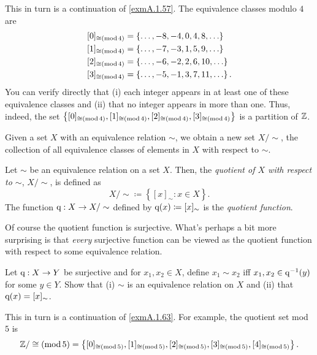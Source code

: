 \begin{exm}\label{exmA.1.63}
This in turn is a continuation of \cref{exmA.1.57}.  The equivalence classes modulo $4$ are
\begin{equation}
\begin{split}
[0]_{\cong \left( \mathrm{mod}\, 4\right)} & =\left\{ \ldots ,-8,-4,0,4,8,\ldots \right\} \\
[1]_{\cong \left( \mathrm{mod}\, 4\right)} & =\left\{ \ldots ,-7,-3,1,5,9,\ldots \right\} \\
[2]_{\cong \left( \mathrm{mod}\, 4\right)} & =\left\{ \ldots ,-6,-2,2,6,10,\ldots \right\} \\
[3]_{\cong \left( \mathrm{mod}\, 4\right)} & =\left\{ \ldots ,-5,-1,3,7,11,\ldots \right\} .
\end{split}
\end{equation}
You can verify directly that (i) each integer appears in at least one of these equivalence classes and (ii) that no integer appears in more than one.  Thus, indeed, the set $\left\{ [0]_{\cong \left( \mathrm{mod}\, 4\right)},[1]_{\cong \left( \mathrm{mod}\, 4\right)},[2]_{\cong \left( \mathrm{mod}\, 4\right)},[3]_{\cong \left( \mathrm{mod}\, 4\right)}\right\}$ is a partition of $\mathbb{Z}$.
\end{exm}

Given a set $X$ with an equivalence relation $\sim$, we obtain a new set $X/\sim$, the collection of all equivalence classes of elements in $X$ with respect to $\sim$.
\begin{dfn}\label{dfnA.1.42}
Let $\sim$ be an equivalence relation on a set $X$.  Then, the \emph{quotient of $X$ with respect to $\sim$}, $X/\sim$, is defined as
\begin{equation}
X/\sim \coloneqq \left\{ [x]_\sim :x\in X\right\} .
\end{equation}
The function $\mathrm{q} :X\rightarrow X/\sim$ defined by $\mathrm{q} (x)\coloneqq [x]_\sim$ is the \emph{quotient function}.
\end{dfn}
Of course the quotient function is surjective.  What's perhaps a bit more surprising is that \emph{every} surjective function can be viewed as the quotient function with respect to some equivalence relation.
\begin{exr}\label{exrA.1.81}
Let $\mathrm{q} :X\rightarrow Y$ be surjective and for $x_1,x_2\in X$, define $x_1\sim x_2$ iff $x_1,x_2\in \mathrm{q} ^{-1}(y)$ for some $y\in Y$.  Show that (i) $\sim$ is an equivalence relation on $X$ and (ii) that $\mathrm{q} (x)=[x]_\sim$.
\end{exr}
\begin{exm}\label{exmA.1.69}
This in turn is a continuation of \cref{exmA.1.63}.  For example, the quotient set mod $5$ is
\begin{equation}
\mathbb{Z} /\cong \left( \mathrm{mod}\, 5\right)=\left\{ [0]_{\cong \left( \mathrm{mod}\, 5\right)},[1]_{\cong \left( \mathrm{mod}\, 5\right)},[2]_{\cong \left( \mathrm{mod}\, 5\right)},[3]_{\cong \left( \mathrm{mod}\, 5\right)},[4]_{\cong \left( \mathrm{mod}\, 5\right)}\right\} .
\end{equation}
\end{exm}

